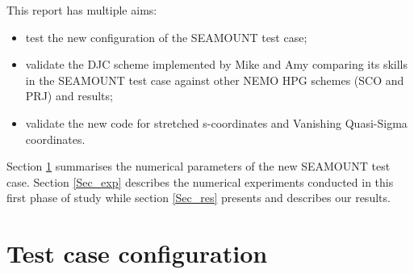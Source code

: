 \documentclass[authoryear]{elsarticle}
\begin{document}
This report has multiple aims:
\begin{itemize}
	\item test the new \cite{Ezer2002} configuration of the SEAMOUNT test case;
	\item validate the DJC scheme implemented by Mike and Amy comparing its skills in the SEAMOUNT test case against other NEMO HPG schemes (SCO and PRJ) and \cite{Ezer2002} results;
	\item validate the new code for stretched s-coordinates and Vanishing Quasi-Sigma coordinates.
\end{itemize}	

Section \ref{Sec_conf} summarises the numerical parameters of the new SEAMOUNT test case. Section \ref{Sec_exp} describes the numerical experiments conducted in this first phase of study while section \ref{Sec_res} presents and describes our results. 

\section{Test case configuration} \label{Sec_conf}
\end{document}
